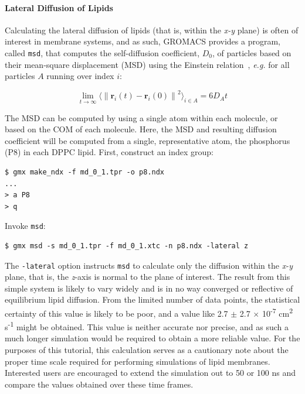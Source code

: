 \documentclass[9pt,tutorial,pubversion]{livecoms}
\newcommand{\norm}[1]{\left\lVert#1\right\rVert}
\begin{document}
\paragraph{Lateral Diffusion of Lipids} \label{kalp_ana_msd}

Calculating the lateral diffusion of lipids (that is, within the {\em x-y} plane) is often of interest in membrane systems, and as such, GROMACS provides a program, called \texttt{msd}, that computes the self-diffusion coefficient, $D_0$, of particles based on their mean-square displacement (MSD) using the Einstein relation~\cite{Allen1987}, {\em e.g.} for all particles $A$ running over index $i$: 

\begin{equation} \label{eq_msd}
\lim_{t\to\infty} \langle \norm{\mathbf{r}_i(t) - \mathbf{r}_i(0)}^2 \rangle_{i \in A} = 6D_{A}t
\end{equation}

The MSD can be computed by using a single atom within each molecule, or based on the COM of each molecule. Here, the MSD and resulting diffusion coefficient will be computed from a single, representative atom, the phosphorus (P8) in each DPPC lipid. First, construct an index group:

\begin{lstlisting}
$ gmx make_ndx -f md_0_1.tpr -o p8.ndx
...
> a P8
> q
\end{lstlisting}

Invoke \texttt{msd}:

\begin{lstlisting}
$ gmx msd -s md_0_1.tpr -f md_0_1.xtc -n p8.ndx -lateral z
\end{lstlisting}

The \texttt{-lateral} option instructs \texttt{msd} to calculate only the diffusion within the {\em x-y} plane, that is, the {\em z}-axis is normal to the plane of interest. The result from this simple system is likely to vary widely and is in no way converged or reflective of equilibrium lipid diffusion. From the limited number of data points, the statistical certainty of this value is likely to be poor, and a value like 2.7 $\pm$ 2.7 $\times$ 10\textsuperscript{-7} cm\textsuperscript{2} s\textsuperscript{-1} might be obtained. This value is neither accurate nor precise, and as such a much longer simulation would be required to obtain a more reliable value. For the purposes of this tutorial, this calculation serves as a cautionary note about the proper time scale required for performing simulations of lipid membranes. Interested users are encouraged to extend the simulation out to 50 or 100 ns and compare the values obtained over these time frames.
\end{document}
